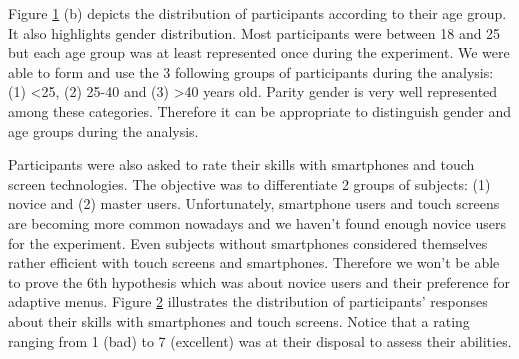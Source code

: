 \begin{figure}[!ht]
    
    \label{fig:participants}
\end{figure}

Figure \ref{fig:participants} (b) depicts the distribution 
of participants according to their age group. It also highlights gender 
distribution. Most participants were between 18 and 25 but each age group was 
at 
least represented once during the experiment. We were able to form and use the 
3 
following groups of participants during the analysis: (1) <25, (2) 25-40 and 
(3) >40 years old. Parity gender is very well represented among these 
categories. Therefore it can be appropriate to distinguish gender and age groups 
during the analysis.\newline

Participants were also asked to rate their skills with smartphones and 
touch screen technologies. The objective was to differentiate 2 groups of 
subjects: (1) novice and (2) master users. Unfortunately, smartphone users 
and touch screens are becoming more common nowadays and we haven't found 
enough 
novice users for the experiment. Even subjects without smartphones considered 
themselves rather efficient with touch screens and 
smartphones. Therefore we won't be able to prove the 6th hypothesis which was 
about novice users and their preference for adaptive menus. Figure 
\ref{fig:participants_skills} illustrates the distribution of participants' 
responses about their skills with smartphones and 
touch screens. Notice that a rating ranging from 1 (bad) to 7 (excellent) was 
at their disposal to assess their abilities.

\begin{figure}[!ht]
    
    \label{fig:participants_skills}
\end{figure}


